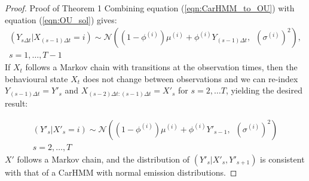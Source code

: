 
\renewcommand*{\thesubsection}{\Alph{subsection}}

\begin{proof}{Proof of Theorem 1}{}
Combining equation (\ref{eqn:CarHMM_to_OU}) with equation (\ref{eqn:OU_sol}) gives:
%
\begin{align*}
\left(Y_{s \Delta t} | X_{(s-1)\Delta t} = i \right) \sim \mathcal{N}\left((1-\phi^{(i)}) \mu^{(i)} + \phi^{(i)} Y_{(s-1) \Delta t}, \enspace \left(\sigma^{(i)}\right)^2 \right),\\
s = 1, \ldots, T-1
\end{align*}
%
If $X_t$ follows a Markov chain with transitions at the observation times, then the behavioural state $X_t$ does not change between observations and we can re-index $Y_{(s-1) \Delta t} = Y'_s$ and $X_{(s-2)\Delta t: (s-1) \Delta t} = X'_s$ for $s = 2,\ldots T$, yielding the desired result:

\begin{align*}
\left(Y'_s| X'_s = i \right) \sim \mathcal{N}\left((1-\phi^{(i)}) \mu^{(i)} + \phi^{(i)} Y'_{s-1}, \enspace \left(\sigma^{(i)}\right)^2 \right)\\
s = 2, \ldots, T
\end{align*}
%
$X'$ follows a Markov chain, and the distribution of $(Y'_s|X'_s,Y'_{s+1})$ is consistent with that of a CarHMM with normal emission distributions.
\end{proof}


